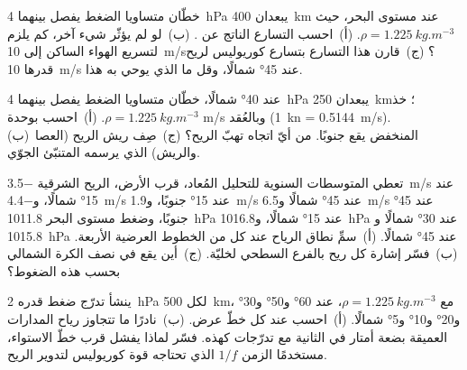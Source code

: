\begin{exercise}[$\star$]\label{exo:b1:atmospheric-circulation:2}
خطّان متساويا الضغط يفصل بينهما \qty{4}{hPa} يبعدان \qty{400}{km} عند مستوى البحر، حيث $\rho =
\qty{1.225}{kg.m^{-3}}$. (أ)~احسب التسارع الناتج عن . (ب)~لو لم يؤثّر شيء آخر، كم يلزم لتسريع الهواء الساكن إلى \qty{10}{m/s}؟ (ج)~قارن هذا التسارع بتسارع كوريوليس لريح قدرها \qty{10}{m/s} عند \ang{45} شمالًا، وقل ما الذي يوحي به هذا.
\end{exercise}

\begin{exercise}[$\star$]\label{exo:b1:atmospheric-circulation:3}
عند \ang{40} شمالًا، خطّان متساويا الضغط يفصل بينهما \qty{4}{hPa} يبعدان \qty{250}{km}؛ خذ $\rho =
\qty{1.225}{kg.m^{-3}}$. (أ)~احسب  بوحدة \unit{m/s} وبالعُقد
(\qty{1}{kn} = \qty{0.5144}{m/s}). (ب)~المنخفض يقع جنوبًا. من أيّ اتجاه تهبّ الريح؟ (ج)~صِف ريش الريح (العصا والريش) الذي يرسمه المتنبّئ الجوّي.
\end{exercise}

\begin{exercise}[$\star$]\label{exo:b1:atmospheric-circulation:4}
تعطي المتوسطات السنوية للتحليل المُعاد، قرب الأرض، الريح الشرقية \qty{-3.5}{m/s} عند \ang{15} شمالًا، و\qty{-4.4}{m/s} عند \ang{15} جنوبًا، و\qty{+1.9}{m/s} عند
\ang{45} شمالًا و\qty{+6.5}{m/s} عند \ang{45} جنوبًا، وضغط مستوى البحر \qty{1011.8}{hPa} عند \ang{15} شمالًا، و\qty{1016.8}{hPa} عند \ang{30} شمالًا و
\qty{1015.8}{hPa} عند \ang{45} شمالًا. (أ)~سمِّ نطاق الرياح عند كل من الخطوط العرضية الأربعة. (ب)~فسّر إشارة كل ريح بالفرع السطحي لخليّة. (ج)~أين يقع  في نصف الكرة الشمالي بحسب هذه الضغوط؟
\end{exercise}

\begin{exercise}[$\star\star$]\label{exo:b1:atmospheric-circulation:5}
ينشأ تدرّج ضغط قدره \qty{2}{hPa} لكل \qty{500}{km}، مع $\rho =
\qty{1.225}{kg.m^{-3}}$، عند \ang{60} و\ang{50} و\ang{30} و\ang{20} و\ang{10} و\ang{5} شمالًا. (أ)~احسب  عند كل خطّ عرض. (ب)~نادرًا ما تتجاوز رياح المدارات العميقة بضعة أمتار في الثانية مع تدرّجات كهذه. فسّر لماذا يفشل  قرب خطّ الاستواء، مستخدمًا الزمن $1/f$ الذي تحتاجه قوة كوريوليس لتدوير الريح.
\end{exercise}

